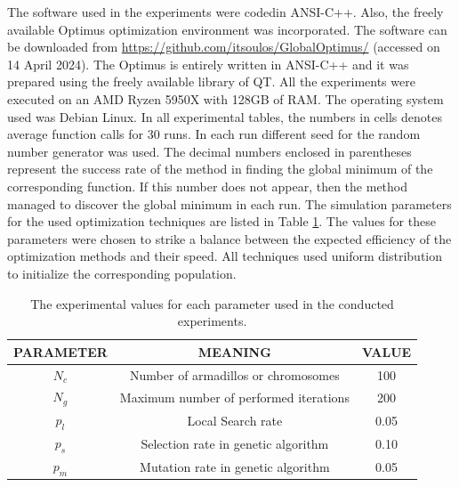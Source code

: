 \documentclass[journal,article,submit,pdftex,moreauthors]{Definitions/mdpi}
\begin{document}
The software used in the experiments were codedin ANSI-C++. Also, the freely available Optimus optimization environment was incorporated. The software can be downloaded from
 \url{https://github.com/itsoulos/GlobalOptimus/} (accessed on 14 April 2024). The Optimus is entirely written in ANSI-C++ and it was prepared using the freely available library of QT. All the experiments were executed on  an AMD Ryzen 5950X with 128GB of RAM. The operating system used was Debian Linux. In all experimental tables, the numbers in cells denotes average function calls for 30  runs. In each run different seed for the random number generator was used.  The decimal numbers enclosed in parentheses represent the success rate of the method in finding the global minimum of the corresponding function. If this number does not appear, then the method managed to discover the global minimum in each run. The simulation parameters for the used optimization techniques are listed in Table  \ref{tab:expSettings}. The values for these parameters were chosen to strike a balance between the expected efficiency of the optimization methods and their speed.
  All techniques used uniform distribution to initialize the corresponding population.

\begin{table}[H]

\caption{The experimental values for each parameter used in the conducted experiments.\label{tab:expSettings}}

\begin{centering}
\begin{tabular}{|c|c|c|}
\hline 
PARAMETER & MEANING & VALUE\tabularnewline
\hline 
\hline 
 $N_c$ & Number of armadillos or chromosomes & 100\tabularnewline
\hline 
$N_g$ &  Maximum number of performed iterations & 200\tabularnewline
\hline 
$p_l$ & Local Search rate & 0.05\tabularnewline
\hline 
$p_s$ & Selection rate in genetic algorithm & 0.10 \tabularnewline
\hline 
$p_m$ & Mutation rate in genetic algorithm & 0.05\tabularnewline

\hline 
\end{tabular}
\par\end{centering}
\end{table}
\end{document}
